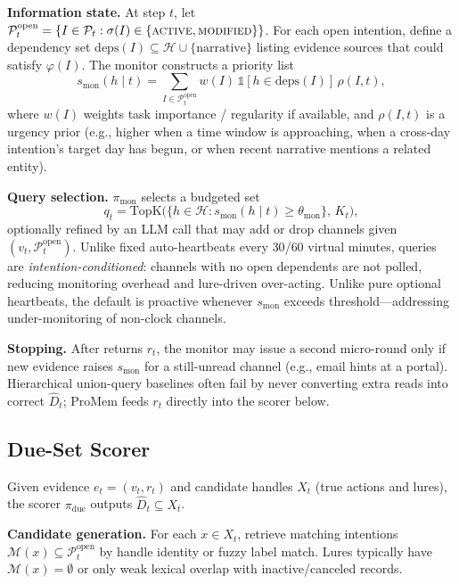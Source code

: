 \noindent\textbf{Information state.}
At step $t$, let $\mathcal{P}_t^{\mathrm{open}}=\{I\in\mathcal{P}_t:\sigma(I)\in\{\textsc{active},\textsc{modified}\}\}$. For each open intention, define a dependency set $\mathrm{deps}(I)\subseteq\mathcal{H}\cup\{\mathrm{narrative}\}$ listing evidence sources that could satisfy $\varphi(I)$. The monitor constructs a priority list
\begin{equation}
\label{eq:monitor-score}
s_{\mathrm{mon}}(h\mid t)=\sum_{I\in\mathcal{P}_t^{\mathrm{open}}} w(I)\,\mathbb{1}[h\in\mathrm{deps}(I)]\,\rho(I,t),
\end{equation}
where $w(I)$ weights task importance / regularity if available, and $\rho(I,t)$ is a urgency prior (e.g., higher when a time window is approaching, when a cross-day intention's target day has begun, or when recent narrative mentions a related entity).

\noindent\textbf{Query selection.}
$\pi_{\mathrm{mon}}$ selects a budgeted set
\begin{equation}
q_t=\mathrm{TopK}\big(\{h\in\mathcal{H}:s_{\mathrm{mon}}(h\mid t)\ge\theta_{\mathrm{mon}}\},\,K_t\big),
\end{equation}
optionally refined by an LLM call that may add or drop channels given $(v_t,\mathcal{P}_t^{\mathrm{open}})$. Unlike fixed auto-heartbeats every $30$/$60$ virtual minutes, queries are \emph{intention-conditioned}: channels with no open dependents are not polled, reducing monitoring overhead and lure-driven over-acting. Unlike pure optional heartbeats, the default is proactive whenever $s_{\mathrm{mon}}$ exceeds threshold---addressing under-monitoring of non-clock channels.

\noindent\textbf{Stopping.}
After returns $r_t$, the monitor may issue a second micro-round only if new evidence raises $s_{\mathrm{mon}}$ for a still-unread channel (e.g., email hints at a portal). Hierarchical union-query baselines often fail by never converting extra reads into correct $\hat{D}_t$; ProMem feeds $r_t$ directly into the scorer below.

\subsection{Due-Set Scorer}
\label{sec:scorer}

Given evidence $e_t=(v_t,r_t)$ and candidate handles $X_t$ (true actions and lures), the scorer $\pi_{\mathrm{due}}$ outputs $\hat{D}_t\subseteq X_t$.

\noindent\textbf{Candidate generation.}
For each $x\in X_t$, retrieve matching intentions $\mathcal{M}(x)\subseteq\mathcal{P}_t^{\mathrm{open}}$ by handle identity or fuzzy label match. Lures typically have $\mathcal{M}(x)=\emptyset$ or only weak lexical overlap with inactive/canceled records.

